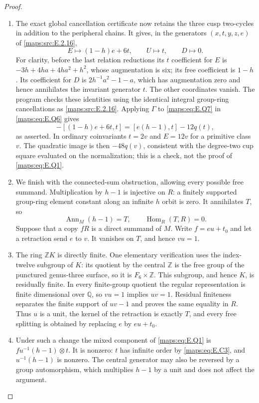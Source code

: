 \begin{proof}
\begin{enumerate}[label=\arabic*.,leftmargin=*]
\item The exact global cancellation certificate now retains
the three cusp two-cycles in addition to the peripheral
chains.  It gives, in the generators $(x,t,y,z,e)$ of
\ref{maps:src:E.2.16},
\[
 E\longmapsto(1-h)e+6t,\qquad
 U\longmapsto t,\qquad D\longmapsto0.
 \tag{E.Q7}\label{maps:eq:E.Q7}
\]
For clarity, before the last relation reductions its
$t$ coefficient for $E$ is
$-3h+4ha+4ha^2+h^2$, whose augmentation is six;
its free coefficient is $1-h$.  Its coefficient for $D$
is $2h^{-1}a^2-1-a$, which has augmentation zero and hence
annihilates the invariant generator $t$.  The other
coordinates vanish.  The program
 checks these identities
using the identical integral group-ring cancellations as
\ref{maps:src:E.2.16}.  Applying $\Gamma$ to \eqref{maps:eq:E.Q7} in \eqref{maps:eq:E.Q6} gives
\[
 -[(1-h)e+6t,t]
                =[e(h-1),t]-12q(t),
\]
as asserted.  In ordinary coinvariants $t=2v$ and
$E=12v$ for a primitive class $v$.  The quadratic image
is then $-48q(v)$, consistent with the degree-two cup
square evaluated on the normalization; this is a check,
not the proof of \eqref{maps:eq:E.Q1}.

\item We finish with the connected-sum obstruction, allowing
every possible free summand.  Multiplication by $h-1$
is injective on $R$: a finitely supported group-ring
element constant along an infinite $h$ orbit is zero.
It annihilates $T$, so
\[
 \operatorname{Ann}_M(h-1)=T,
                       \qquad\operatorname{Hom}_R(T,R)=0.
 \tag{E.Q8}\label{maps:eq:E.Q8}
\]
Suppose that a copy $fR$ is a direct summand of $M$.
Write $f=eu+t_0$ and let a retraction send $e$ to $v$.
It vanishes on $T$, and hence $vu=1$.

\item The ring $\mathbb ZK$ is directly finite.  One elementary
verification uses the index-twelve subgroup of $K$:
its quotient by the central $\mathbb Z$ is the free group
of the punctured genus-three surface, so it is
$F_6\times\mathbb Z$.  This subgroup, and hence $K$, is
residually finite.  In every finite-group quotient the
regular representation is finite dimensional over
$\mathbb Q$, so $vu=1$ implies $uv=1$.  Residual
finiteness separates the finite support of $uv-1$ and
proves the same equality in $R$.  Thus $u$ is a unit,
the kernel of the retraction is exactly $T$, and every
free splitting is obtained by replacing $e$ by
$eu+t_0$.

\item Under such a change the mixed component of \eqref{maps:eq:E.Q1} is
$f u^{-1}(h-1)\otimes t$.  It is nonzero: $t$ has
infinite order by \eqref{maps:eq:E.C3}, and $u^{-1}(h-1)$ is nonzero.
The central generator may also be reversed by a group
automorphism, which multiplies $h-1$ by a unit and
does not affect the argument.


\end{enumerate}
\end{proof}
